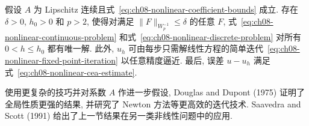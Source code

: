 \begin{Theorem}
\label{thm:ch08-nonlinear-existence-uniqueness}
假设 $A$ 为 Lipschitz 连续且式~\eqref{eq:ch08-nonlinear-coefficient-bounds} 成立. 存在 $\delta>0$, $h_0>0$ 和 $p>2$, 使得对满足 $\|F\|_{W_p^{-1}}\leq\delta$ 的任意 $F$, 式~\eqref{eq:ch08-nonlinear-continuous-problem} 和式~\eqref{eq:ch08-nonlinear-discrete-problem} 对所有 $0<h\leq h_0$ 都有唯一解. 此外, $u_h$ 可由每步只需解线性方程的简单迭代~\eqref{eq:ch08-nonlinear-fixed-point-iteration} 以任意精度逼近. 最后, 误差 $u-u_h$ 满足式~\eqref{eq:ch08-nonlinear-cea-estimate}.
\end{Theorem}

使用更复杂的技巧并对系数 $A$ 作进一步假设, Douglas and Dupont (1975) 证明了全局性质更强的结果, 并研究了 Newton 方法等更高效的迭代技术. Saavedra and Scott (1991) 给出了上一节结果在另一类非线性问题中的应用.
